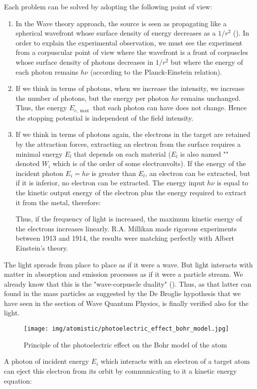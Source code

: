 	Each problem can be solved by adopting the following point of view:
	\begin{enumerate}
		\item In the Wave theory approach, the source is seen as propagating like a spherical wavefront whose surface density of energy decreases as a $1/r^2$ (). In order to explain the experimental observation, we must see the experiment from a corpuscular point of view where the wavefront is a front of corpuscles whose surface density of photons decreases in $1/r^2$ but where the energy of each photon remains $h\nu$ (according to the Planck-Einstein relation).
		
		\item If we think in terms of photons, when we increase the intensity, we increase the number of photons, but the energy per photon $h\nu$ remains unchanged. Thus, the energy $E_{c,\max}$ that each photon can have does not change. Hence the stopping potential is independent of the field intensity.
		
		\item If we think in terms of photons again, the electrons in the target are retained by the attraction forces, extracting an electron from the surface requires a minimal energy $E_l$ that depends on each material ($E_l$ is also named "" denoted $W_i$ which is of the order of some electronvolts). If the energy of the incident photon $E_i=h\nu$ is greater than $E_l$, an electron can be extracted, but if it is inferior, no electron can be extracted. The energy input $h\nu$ is equal to the kinetic output energy of the electron plus the energy required to extract it from the metal, therefore:
		
		Thus, if the frequency of light is increased, the maximum kinetic energy of the electrons increases linearly. R.A. Millikan made rigorous experiments between 1913 and 1914, the results were matching perfectly with Albert Einstein's theory.
	\end{enumerate}
	The light spreads from place to place as if it were a wave. But light interacts with matter in absorption and emission processes as if it were a particle stream. We already know that this is the  "wave-corpuscle duality" (). Thus, as that latter can found in the mass particles as suggested by the De Broglie hypothesis that we have seen in the section of Wave Quantum Physics, is finally verified also for the light.
	\begin{figure}[H]
		\centering
		\texttt{[image: img/atomistic/photoelectric\_effect\_bohr\_model.jpg]}
		\caption{Principle of the photoelectric effect on the Bohr model of the atom}
	\end{figure}
	A photon of incident energy $E_i$ which interacts with an electron of a target atom can eject this electron from its orbit by communicating to it a kinetic energy equation:
	
